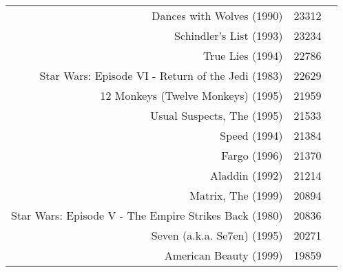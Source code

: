 \documentclass[11pt]{article}
\begin{document}
\begin{tabular}{r|ll}
	 Dances with Wolves (1990)                                                      & 23312                                                                         \\
	 Schindler's List (1993)                                                        & 23234                                                                         \\
	 True Lies (1994)                                                               & 22786                                                                         \\
	 Star Wars: Episode VI - Return of the Jedi (1983)                              & 22629                                                                         \\
	 12 Monkeys (Twelve Monkeys) (1995)                                             & 21959                                                                         \\
	 Usual Suspects, The (1995)                                                     & 21533                                                                         \\
	 Speed (1994)                                                                   & 21384                                                                         \\
	 Fargo (1996)                                                                   & 21370                                                                         \\
	 Aladdin (1992)                                                                 & 21214                                                                         \\
	 Matrix, The (1999)                                                             & 20894                                                                         \\
	 Star Wars: Episode V - The Empire Strikes Back (1980)                          & 20836                                                                         \\
	 Seven (a.k.a. Se7en) (1995)                                                    & 20271                                                                         \\
	 American Beauty (1999)                                                         & 19859                                                                         \\

\end{tabular}
\end{document}
